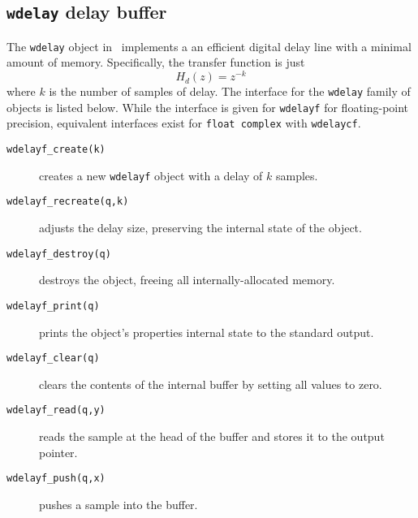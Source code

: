 \subsection{{\tt wdelay} delay buffer}
\label{module:buffer:wdelay}
The {\tt wdelay} object in \liquid\ implements a an efficient digital
delay line with a minimal amount of memory.
Specifically, the transfer function is just
%
\begin{equation}
\label{eqn:buffer:wdelay}
    H_d(z) = z^{-k}
\end{equation}
%
where $k$ is the number of samples of delay.
%
The interface for the {\tt wdelay} family of objects is listed below.
While the interface is given for {\tt wdelayf} for floating-point
precision, equivalent interfaces exist for
{\tt float complex} with {\tt wdelaycf}.
%
\begin{description}
\item[{\tt wdelayf\_create(k)}]
    creates a new {\tt wdelayf} object with a delay of $k$ samples.
\item[{\tt wdelayf\_recreate(q,k)}]
    adjusts the delay size, preserving the internal state of the object.
\item[{\tt wdelayf\_destroy(q)}]
    destroys the object, freeing all internally-allocated memory.
\item[{\tt wdelayf\_print(q)}]
    prints the object's properties internal state to the standard
    output.
\item[{\tt wdelayf\_clear(q)}]
    clears the contents of the internal buffer by setting all values to
    zero.
\item[{\tt wdelayf\_read(q,y)}]
    reads the sample at the head of the buffer and stores it to the
    output pointer.
\item[{\tt wdelayf\_push(q,x)}]
    pushes a sample into the buffer.
\end{description}
